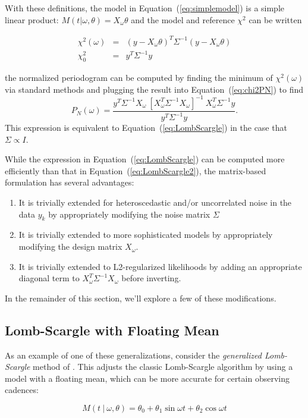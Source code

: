 \documentclass[12pt,preprint]{aastex}
\newcommand{\Eq}[1]{Equation~(\ref{eq:#1})}
\newcommand{\eq}[1]{\Eq{#1}}
\newcommand{\eqlabel}[1]{\label{eq:#1}}
\begin{document}
With these definitions, the model in \eq{simplemodel} is a simple linear product: $M(t|\omega,\theta) = X_\omega\theta$ and the model and reference $\chi^2$ can be written

\begin{eqnarray}
  \chi^2(\omega) &=& (y - X_\omega\theta)^T\Sigma^{-1}(y - X_\omega\theta)\\
  \chi^2_0 &=& y^T \Sigma^{-1} y
\end{eqnarray}

the normalized periodogram can be computed by finding the minimum of $\chi^2(\omega)$ via standard methods and plugging the result into \eq{chi2PN} to find
\begin{equation}
  \eqlabel{LombScargle2}
  P_N(\omega) = \frac{y^T\Sigma^{-1}X_\omega~[X_\omega^T\Sigma^{-1}X_\omega]^{-1}~X_\omega^T\Sigma^{-1}y}{y^T\Sigma^{-1}y}.
\end{equation}
This expression is equivalent to \eq{LombScargle} in the case that $\Sigma \propto I$.

While the expression in \eq{LombScargle} can be computed more efficiently than that in \eq{LombScargle2}, the matrix-based formulation has several advantages:
\begin{enumerate}
  \item It is trivially extended for heteroscedastic and/or uncorrelated noise in the data $y_k$ by appropriately modifying the noise matrix $\Sigma$
  \item It is trivially extended to more sophisticated models by appropriately modifying the design matrix $X_\omega$.
  \item It is trivially extended to L2-regularized likelihoods by adding an appropriate diagonal term to $X_\omega^T\Sigma^{-1}X_\omega$ before inverting.
\end{enumerate}
In the remainder of this section, we'll explore a few of these modifications.

\subsection{Lomb-Scargle with Floating Mean}
As an example of one of these generalizations, consider the {\it generalized Lomb-Scargle} method of \citet{Zechmeister09}. This adjusts the classic Lomb-Scargle algorithm by using a model with a floating mean, which can be more accurate for certain observing cadences:

\begin{equation}
  M(t~|~\omega, \theta) = \theta_0 + \theta_1\sin\omega t + \theta_2\cos\omega t
\end{equation}
\end{document}
